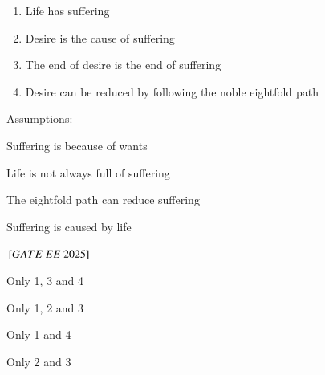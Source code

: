 \documentclass[journal,12pt,onecolumn]{IEEEtran}
\theoremstyle{remark}
\begin{document}
\begin{enumerate}
\begin{enumerate}
    \item Life has suffering
    \item Desire is the cause of suffering
    \item The end of desire is the end of suffering
    \item Desire can be reduced by following the noble eightfold path
\end{enumerate}
Assumptions:
\begin{enumerate}
\begin{multicols}{2}
    \item Suffering is because of wants
    \item Life is not always full of suffering
    \item The eightfold path can reduce suffering
    \item Suffering is caused by life
\end{multicols} \end{enumerate}    
\hfill ${}\left[GATE\ EE\ 2025\right]$
    \begin{enumerate}
    \begin{multicols}{2}
 \item Only 1, 3 and 4 \\
\item Only 1, 2 and 3 \\
\item Only 1 and 4 \\
\item Only 2 and 3 \\
   \end{multicols} \end{enumerate}


\end{enumerate}
\end{document}
